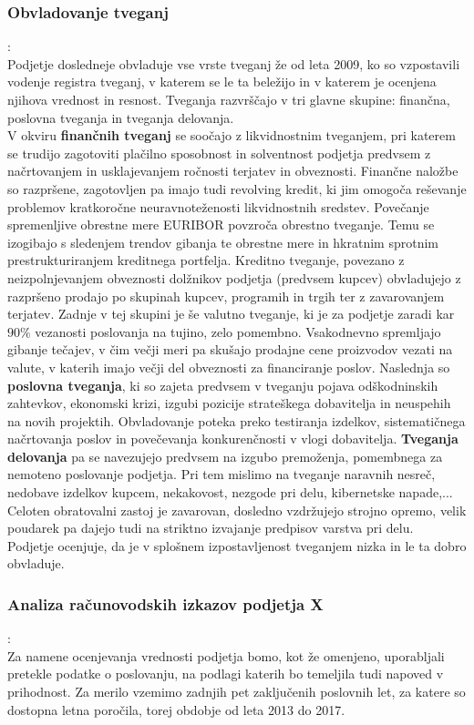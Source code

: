 \documentclass[12pt,a4paper]{amsart}
\theoremstyle{definition} %
\theoremstyle{plain} %
\begin{document}
\subsubsection{Obvladovanje tveganj}:\\
Podjetje dosledneje obvladuje vse vrste tveganj že od leta 2009, ko so vzpostavili vodenje registra tveganj, v katerem se le ta beležijo in v katerem je ocenjena njihova vrednost in resnost. Tveganja razvrščajo v tri glavne skupine: finančna, poslovna tveganja in tveganja delovanja.\\
V okviru \textbf{finančnih tveganj} se soočajo z likvidnostnim tveganjem, pri katerem se trudijo zagotoviti plačilno sposobnost in solventnost podjetja predvsem z načrtovanjem in usklajevanjem ročnosti terjatev in obveznosti. Finančne naložbe so razpršene, zagotovljen pa imajo tudi revolving kredit, ki jim omogoča reševanje problemov kratkoročne neuravnoteženosti likvidnostnih sredstev. Povečanje spremenljive obrestne mere EURIBOR povzroča obrestno tveganje. Temu se izogibajo s sledenjem trendov gibanja te obrestne mere in hkratnim sprotnim prestrukturiranjem kreditnega portfelja. Kreditno tveganje, povezano z neizpolnjevanjem obveznosti dolžnikov podjetja (predvsem kupcev) obvladujejo z razpršeno prodajo po skupinah kupcev, programih in trgih ter z zavarovanjem terjatev. Zadnje v tej skupini je še valutno tveganje, ki je za podjetje zaradi kar $90\%$ vezanosti poslovanja na tujino, zelo pomembno. Vsakodnevno spremljajo gibanje tečajev, v čim večji meri pa skušajo prodajne cene proizvodov vezati na valute, v katerih imajo večji del obveznosti za financiranje poslov. Naslednja so \textbf{poslovna tveganja}, ki so zajeta predvsem v tveganju pojava odškodninskih zahtevkov, ekonomski krizi, izgubi pozicije strateškega dobavitelja in neuspehih na novih projektih. Obvladovanje poteka preko testiranja izdelkov, sistematičnega načrtovanja poslov in povečevanja konkurenčnosti v vlogi dobavitelja. \textbf{Tveganja delovanja} pa se navezujejo predvsem na izgubo premoženja, pomembnega za nemoteno poslovanje podjetja. Pri tem mislimo na tveganje naravnih nesreč, nedobave izdelkov kupcem, nekakovost, nezgode pri delu, kibernetske napade,... Celoten obratovalni zastoj je zavarovan, dosledno vzdržujejo strojno opremo, velik poudarek pa dajejo tudi na striktno izvajanje predpisov varstva pri delu.\\
Podjetje ocenjuje, da je v splošnem izpostavljenost tveganjem nizka in le ta dobro obvladuje.


\subsubsection{Analiza računovodskih izkazov podjetja X}:\\
Za namene ocenjevanja vrednosti podjetja bomo, kot že omenjeno, uporabljali pretekle podatke o poslovanju, na podlagi katerih bo temeljila tudi napoved v prihodnost. Za merilo vzemimo zadnjih pet zaključenih poslovnih let, za katere so dostopna letna poročila, torej obdobje od leta 2013 do 2017.\par
\end{document}
